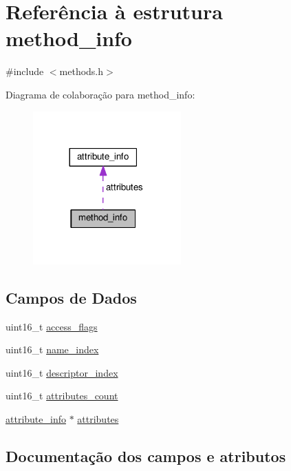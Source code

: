 \hypertarget{structmethod__info}{}\section{Referência à estrutura method\+\_\+info}
\label{structmethod__info}


{\ttfamily \#include $<$methods.\+h$>$}



Diagrama de colaboração para method\+\_\+info\+:\nopagebreak
\begin{figure}[H]
\begin{center}
\leavevmode
\includegraphics[width=161pt]{structmethod__info__coll__graph}
\end{center}
\end{figure}
\subsection*{Campos de Dados}
\begin{DoxyCompactItemize}
\item 
uint16\+\_\+t \hyperlink{structmethod__info_a8fc68aba419f2617deda879c467f5410}{access\+\_\+flags}
\item 
uint16\+\_\+t \hyperlink{structmethod__info_af0ba3d6d566432e74eed5c37cd998c14}{name\+\_\+index}
\item 
uint16\+\_\+t \hyperlink{structmethod__info_abccd6a5202d4c0ee1be6b89692d0352a}{descriptor\+\_\+index}
\item 
uint16\+\_\+t \hyperlink{structmethod__info_a9e711e4dfb8181f7dce16c6f640ba734}{attributes\+\_\+count}
\item 
\hyperlink{structattribute__info}{attribute\+\_\+info} $\ast$ \hyperlink{structmethod__info_a8ce4caaa03680c91f548558a38647ad8}{attributes}
\end{DoxyCompactItemize}


\subsection{Documentação dos campos e atributos}
